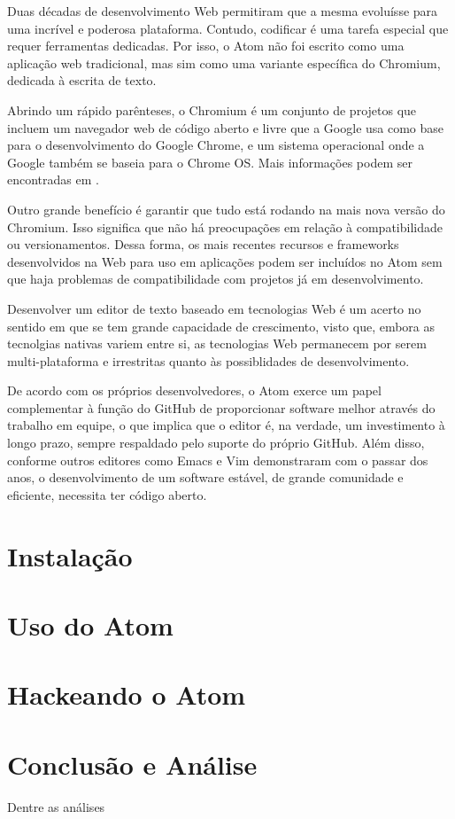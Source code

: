 	Duas décadas de desenvolvimento Web permitiram que a mesma evoluísse para uma incrível e poderosa plataforma. Contudo, codificar é uma tarefa especial que requer ferramentas dedicadas. Por isso, o Atom não foi escrito como uma aplicação web tradicional, mas sim como uma variante específica do Chromium, dedicada à escrita de texto.

	Abrindo um rápido parênteses, o Chromium é um conjunto de projetos que incluem um navegador web de código aberto e livre que a Google usa como base para o desenvolvimento do Google Chrome, e um sistema operacional onde a Google também se baseia para o Chrome OS. Mais informações podem ser encontradas em \cite{doc:chromium}.

	Outro grande benefício é garantir que tudo está rodando na mais nova versão do Chromium. Isso significa que não há preocupações em relação à compatibilidade ou versionamentos. Dessa forma, os mais recentes recursos e frameworks desenvolvidos na Web para uso em aplicações podem ser incluídos no Atom sem que haja problemas de compatibilidade com projetos já em desenvolvimento.

	Desenvolver um editor de texto baseado em tecnologias Web é um acerto no sentido em que se tem grande capacidade de crescimento, visto que, embora as tecnolgias nativas variem entre si, as tecnologias Web permanecem por serem multi-plataforma e irrestritas quanto às possiblidades de desenvolvimento.

	De acordo com os próprios desenvolvedores, o Atom exerce um papel complementar à função do GitHub de proporcionar software melhor através do trabalho em equipe, o que implica que o editor é, na verdade, um investimento à longo prazo, sempre respaldado pelo suporte do próprio GitHub. Além disso, conforme outros editores como Emacs e Vim demonstraram com o passar dos anos, o desenvolvimento de um software estável, de grande comunidade e eficiente, necessita ter código aberto.

	\section{Instalação}

	\section{Uso do Atom}

	\section{Hackeando o Atom}

	\section{Conclusão e Análise}
	Dentre as análises

	
	


